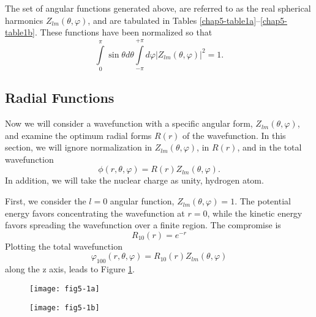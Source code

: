 The set of angular functions generated above, are referred to as the
real spherical harmonics $Z_{lm} ( \theta , \varphi )$, and are
tabulated in Tables \ref{chap5-table1a}--\ref{chap5-table1b}. These functions
have been normalized so that
\begin{equation}
\int\limits_{0}^{\pi} \sin \theta d \theta \int\limits_{- \pi}^{+ \pi} d 
\varphi | Z_{lm} \left( \theta , \varphi \right) |^2 = 1.
\end{equation}

\subsection{Radial Functions}

Now we will consider a wavefunction with a specific angular form, 
$Z_{lm} ( \theta , \varphi)$, and examine the optimum radial forms $R(r)$ of 
the wavefunction.  In this section, we will ignore normalization in 
$Z_{lm}( \theta , \varphi)$, in $R(r)$, and in the total wavefunction
\begin{equation}
\phi ( r , \theta , \varphi ) = R ( r ) Z_{lm} ( \theta , \varphi ) .
\end{equation}
In addition, we will take the nuclear charge as unity, hydrogen atom.

First, we consider the $l = 0$ angular function, $Z_{lm} ( \theta , 
\varphi ) = 1$.  The potential energy favors concentrating the wavefunction 
at $r = 0$, while the kinetic energy favors spreading the wavefunction over 
a finite region.  The compromise is
\begin{equation}
R_{10} (r) = e^{-r}
\label{chap5-eqno5}
\end{equation}
Plotting the total wavefunction
\begin{equation}
\varphi_{100} ( r , \theta , \varphi ) = R_{10} (r) Z_{lm} ( \theta , 
\varphi )
\end{equation}
along the z axis, leads to Figure \ref{fig5-1a}.

\begin{figure}
\begin{center}
\texttt{[image: fig5-1a]}
\end{center}
\caption{}
\label{fig5-1a}
\end{figure}

\begin{figure}
\begin{center}
\texttt{[image: fig5-1b]}
\end{center}
\caption{}
\label{fig5-1b}
\end{figure}

